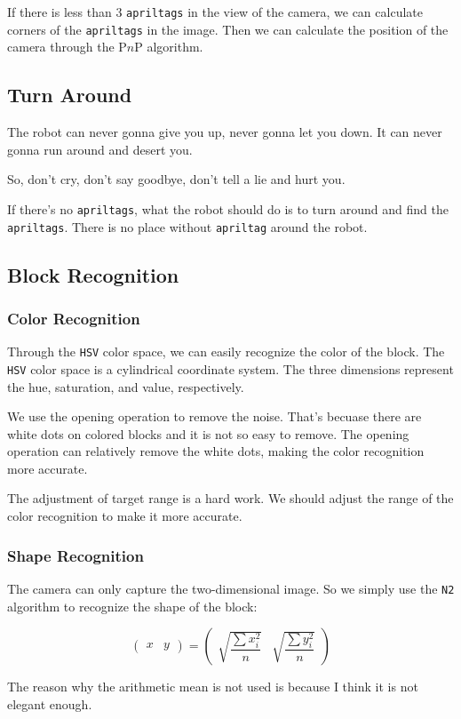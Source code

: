 \documentclass{article}
\begin{document}
If there is less than $3$ \texttt{apriltags} in the view of the camera, we can calculate corners of the \texttt{apriltags} in the image. Then we can calculate the position of the camera through the P$n$P algorithm.

\subsection{Turn Around}
The robot can never gonna give you up, never gonna let you down. It can never gonna run around and desert you.

So, don't cry, don't say goodbye, don't tell a lie and hurt you.

If there's no \texttt{apriltags}, what the robot should do is to turn around and find the \texttt{apriltags}. There is no place without \texttt{apriltag} around the robot.

\subsection{Block Recognition}

\subsubsection{Color Recognition}
Through the \texttt{HSV} color space, we can easily recognize the color of the block. The \texttt{HSV} color space is a cylindrical coordinate system. The three dimensions represent the hue, saturation, and value, respectively.

We use the opening operation to remove the noise. That's becuase there are white dots on colored blocks and it is not so easy to remove. The opening operation can relatively remove the white dots, making the color recognition more accurate.

The adjustment of target range is a hard work. We should adjust the range of the color recognition to make it more accurate.

\subsubsection{Shape Recognition}
The camera can only capture the two-dimensional image. So we simply use the \texttt{N2} algorithm to recognize the shape of the block:

\[
  \left(\begin{matrix}x&y\end{matrix}\right)=\left(\begin{matrix}\sqrt{\dfrac{\sum x_i^2}{n}}&\sqrt{\dfrac{\sum y_i^2}{n}}\end{matrix}\right)
\]

The reason why the arithmetic mean is not used is because I think it is not elegant enough.
\end{document}
